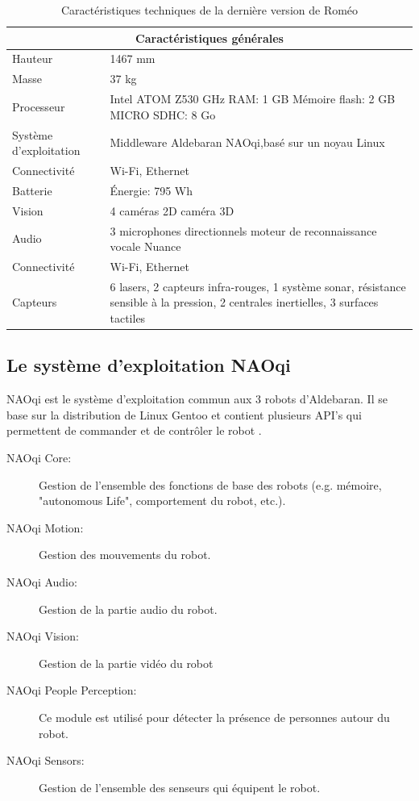 \begin{table}[H]
	\begin{tabular}{ | l | p{10cm} | }
		\hline
		\multicolumn{2}{|c|}{Caractéristiques générales} \\
		\hline
		Hauteur & 1467 mm \\
		\hline 
		Masse & 37 kg \\
		\hline
		Processeur & Intel ATOM Z530 \newline 1.6 GHz \newline RAM: 1 GB \newline Mémoire flash: 2 GB \newline MICRO SDHC: 8 Go  \\
		\hline
		Système d'exploitation & Middleware Aldebaran NAOqi,\newline basé sur un noyau Linux \\
		\hline
		Connectivité & Wi-Fi, Ethernet \\
		\hline
		Batterie & Énergie: 795 Wh \\
		\hline 
		Vision & 4 caméras 2D \newline 1 caméra 3D \\
		\hline
		Audio & 3 microphones directionnels \newline moteur de reconnaissance vocale Nuance  \\
		\hline
		Connectivité & Wi-Fi, Ethernet \\
		\hline
		Capteurs & 6 lasers, 2 capteurs infra-rouges, 1 système sonar, résistance sensible à la pression, 2 centrales inertielles, 3 surfaces tactiles \\
		\hline
	\end{tabular}
	\caption[Caractéristiques techniques de Roméo]{Caractéristiques techniques de la dernière version de Roméo}
	\label {tab: Caractéristiques techniques de Roméo}
	\cite{RomeoTech}
\end{table}

\subsection{Le système d'exploitation NAOqi}
\label{Entreprise: Les produits: NAOqi}
NAOqi est le système d'exploitation commun aux 3 robots d'Aldebaran. Il se base sur la distribution de Linux Gentoo et contient plusieurs API's qui permettent de commander et de contrôler le robot \cite{NAOqiTech}.
\begin{description}
	\item [NAOqi Core:] Gestion de l'ensemble des fonctions de base des robots (e.g. mémoire, "autonomous Life", comportement du robot, etc.).
	\item [NAOqi Motion:] Gestion des mouvements du robot.
	\item [NAOqi Audio:]  Gestion de la partie audio du robot.
	\item [NAOqi Vision:] Gestion de la partie vidéo du robot
	\item [NAOqi People Perception:] Ce module est utilisé pour détecter la présence de personnes autour du robot.
	\item [NAOqi Sensors:]  Gestion de l'ensemble des senseurs qui équipent le robot.
\end{description} 


